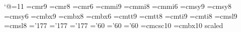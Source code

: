 %
%
%
\catcode`@=11 %
%
%
%
\font\ninerm=cmr9  \font\eightrm=cmr8  \font\sixrm=cmr6
\font\ninei=cmmi9  \font\eighti=cmmi8  \font\sixi=cmmi6
\font\ninesy=cmsy9 \font\eightsy=cmsy8 \font\sixsy=cmsy6
\font\ninebf=cmbx9 \font\eightbf=cmbx8 \font\sixbf=cmbx6
\font\ninett=cmtt9 \font\eighttt=cmtt8 
\font\nineit=cmti9 \font\eightit=cmti8
\font\ninesl=cmsl9 \font\eightsl=cmsl8
\skewchar\ninei='177  \skewchar\eighti='177  \skewchar\sixi='177
\skewchar\ninesy='60  \skewchar\eightsy='60  \skewchar\sixsy='60
\hyphenchar{} \hyphenchar{} \hyphenchar{}
\font\csc=cmcsc10
\font\titlefont=cmbx10 scaled
%
%
\newskip\ttglue					%
\def\tenpoint{\def\rm{\fam0\tenrm}%
 \gdef\t@size{\grtenpoint} %
 \textfont0=\tenrm  \scriptfont0=\sevenrm  \scriptscriptfont0=\fiverm
 \textfont1=\teni   \scriptfont1=\seveni   \scriptscriptfont1=\fivei
 \textfont2=\tensy  \scriptfont2=\sevensy  \scriptscriptfont2=\fivesy
 \textfont3=\tenex  \scriptfont3=\tenex    \scriptscriptfont3=\tenex
 \textfont\itfam=\tenit  \def\it{\fam\itfam\tenit}
 \textfont\slfam=\tensl  \def\sl{\fam\slfam\tensl}
 \textfont\ttfam=\tentt  \def\tt{\fam\ttfam\tentt}
 \textfont\bffam=\tenbf  \def\bf{\fam\bffam\tenbf}
  \scriptfont\bffam=\sevenbf \scriptscriptfont\bffam=\fivebf
 \tt \ttglue=.5em plus .25em minus.15em
 \normalbaselineskip=.6cm
 \setbox\strutbox=\hbox{\vrule height8.5pt width0pt depth4.5pt}%
 \let\sc=\eightrm \normalbaselines\rm}
